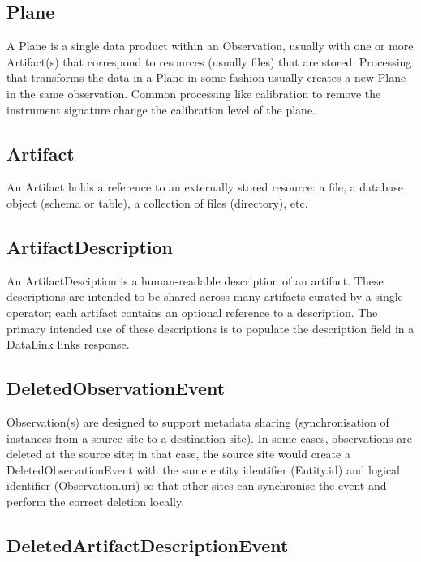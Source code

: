 \documentclass[11pt,a4paper]{ivoa}
\begin{document}
\subsection{Plane}

A Plane is a single data product within an Observation, usually with one or more
Artifact(s) that correspond to resources (usually files) that are stored. Processing
that transforms the data in a Plane in some fashion usually creates a new Plane in
the same observation. Common processing like calibration to remove the instrument
signature change the calibration level of the plane.

\subsection{Artifact}

An Artifact holds a reference to an externally stored resource: a file, a
database object (schema or table), a collection of files (directory), etc.

\subsection{ArtifactDescription}

An ArtifactDesciption is a human-readable description of an artifact. These
descriptions are intended to be shared across many artifacts curated by a single
operator; each artifact contains an optional reference to a description. The
primary intended use of these descriptions is to populate the description field
in a DataLink links response.

\subsection{DeletedObservationEvent}

Observation(s) are designed to support metadata sharing (synchronisation of instances
from a source site to a destination site). In some cases, observations are deleted at the 
source site; in that case, the source site would create a DeletedObservationEvent with the same 
entity identifier (Entity.id) and logical identifier (Observation.uri) so that other sites can
synchronise the event and perform the correct deletion locally.

\subsection{DeletedArtifactDescriptionEvent}
\end{document}
